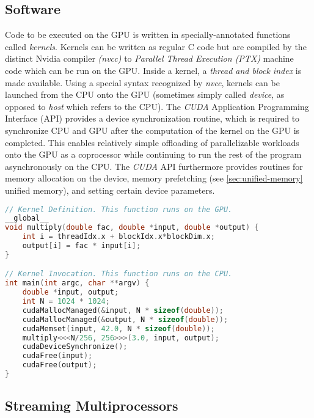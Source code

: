 \subsection{Software}

Code to be executed on the GPU is written in specially-annotated functions called \emph{kernels}. Kernels can be written as regular C code but are compiled by the distinct Nvidia compiler \emph{(nvcc)} to \emph{Parallel Thread Execution (PTX)} machine code which can be run on the GPU. Inside a kernel, a \emph{thread and block index} is made available. Using a special syntax recognized by \emph{nvcc}, kernels can be launched from the CPU onto the GPU (sometimes simply called \emph{device}, as opposed to \emph{host} which refers to the CPU). The \emph{CUDA} Application Programming Interface (API) provides a device synchronization routine, which is required to synchronize CPU and GPU after the computation of the kernel on the GPU is completed. This enables relatively simple offloading of parallelizable workloads onto the GPU as a coprocessor while continuing to run the rest of the program asynchronously on the CPU. The \emph{CUDA} API furthermore provides routines for memory allocation on the device, memory prefetching (see \ref{sec:unified-memory} unified memory), and setting certain device parameters.

\begin{lstfloat}
\begin{lstlisting}[caption={Example showing kernel, its launch and CUDA API calls for allocating unified memory},captionpos=b,language=C]
// Kernel Definition. This function runs on the GPU.
__global__
void multiply(double fac, double *input, double *output) {
    int i = threadIdx.x + blockIdx.x*blockDim.x;
    output[i] = fac * input[i];
}

// Kernel Invocation. This function runs on the CPU.
int main(int argc, char **argv) {
    double *input, output;
    int N = 1024 * 1024;
    cudaMallocManaged(&input, N * sizeof(double));
    cudaMallocManaged(&output, N * sizeof(double));
    cudaMemset(input, 42.0, N * sizeof(double));
    multiply<<<N/256, 256>>>(3.0, input, output);
    cudaDeviceSynchronize();
    cudaFree(input);
    cudaFree(output);
}
\end{lstlisting}
\end{lstfloat}

\subsection{Streaming Multiprocessors} \label{sec:hardware}


